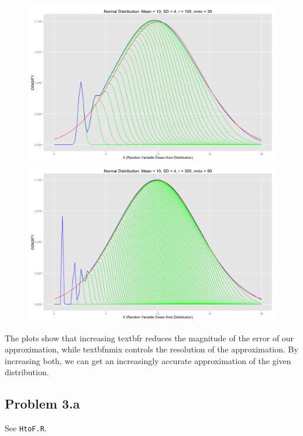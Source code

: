 \documentclass[letter]{article}
\begin{document}
\begin{figure}[H]
\includegraphics[scale=.27]{normdist_10_4_100_30.png}\\
\includegraphics[scale=.54]{normdist_10_4_300_90.png}
\end{figure}

The plots show that increasing textbf{r} reduces the magnitude of the error of our approximation, while textbf{nmix} controls the resolution of the approximation.  By increasing both, we can get an increasingly accurate approximation of the given distribution.

\subsection*{Problem 3.a}
See \texttt{HtoF.R}. 

\end{document}
